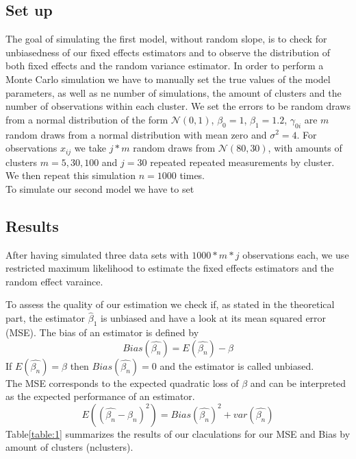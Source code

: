 \documentclass[a4paper,11pt]{article}
\begin{document}
	\subsection{Set up}
	The goal of simulating the first model, without random slope, is to check for unbiasedness of our fixed effects estimators and to observe the distribution of both fixed effects and the random variance estimator. In order to perform a Monte Carlo simulation we have to manually set the true values of the model parameters, as well as ne number of simulations, the amount of clusters and the number of observations within each cluster. We set the errors to be random draws from a normal distribution of the form $\mathcal{N}(0,1)$, $\beta_0=1$, $\beta_1=1.2$, $\gamma_{0i}$ are $m$ random draws from a normal distribution with mean zero and $\sigma^2=4$. For observations $x_{ij}$ we take $j*m$ random draws from $\mathcal{N}(80,30)$, with amounts of clusters $m={5,30,100}$ and $j=30$ repeated repeated measurements by cluster. We then repeat this simulation $n=1000$ times.
	\\
	To simulate our second model we have to set 
	\subsection{Results}
	After having simulated three data sets with $1000*m*j$ observations each, we use restricted maximum likelihood to estimate the fixed effects estimators and the random effect varaince.
	
	To assess the quality of our estimation we check if, as stated in the theoretical part, the estimator $\hat\beta_1$ is unbiased and have a look at its mean squared error (MSE). The bias of an estimator is defined by 
	\begin{equation}
		Bias(\hat{\beta_{n}})=E(\hat{\beta_n})-\beta
	\end{equation}
	If $E(\hat{\beta_n})=\beta$ then $Bias(\hat{\beta_{n}})=0$ and the estimator is called unbiased.\\
	The MSE corresponds to the expected quadratic loss of $\beta$ and can be interpreted as the expected performance of an estimator.
	\begin{equation}\label{eq:MSE}
		E((\hat{\beta_{n}}-\beta_{n})^2)=Bias(\hat{\beta_{n}})^2+var(\hat{\beta_{n}})
	\end{equation}
	Table\ref{table:1} summarizes the results of our claculations for our MSE and Bias by amount of clusters (nclusters).
	
\end{document}
